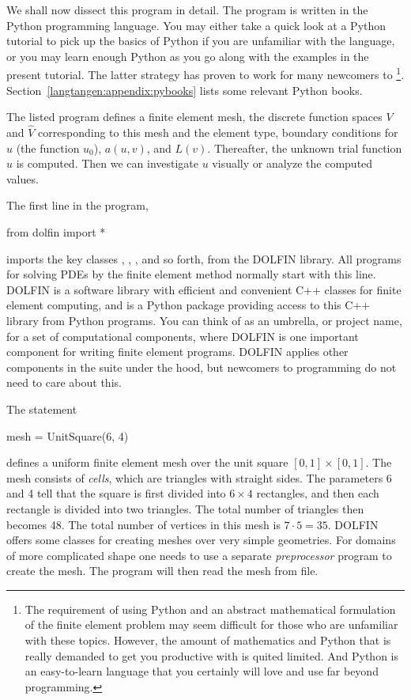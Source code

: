 We shall now dissect this \fenics{} program in detail. The program
is written in the Python programming language.
You may either take a quick look at a Python tutorial \citep{PythonTutorial}
to pick up the basics of Python if you are unfamiliar with the language,
or you may learn enough Python as you go along with the examples in the
present tutorial. The latter strategy has proven to work for many newcomers
to \fenics\footnote{The requirement of using Python and an abstract
mathematical formulation of the finite element problem may seem
difficult for those who are unfamiliar with these topics.
However, the amount of mathematics and Python that is really demanded
to get you productive with \fenics{} is quited limited.
And Python is an easy-to-learn language that you certainly will love
and use far beyond \fenics{} programming.}.
Section~\ref{langtangen:appendix:pybooks} lists some relevant Python books.

The listed \fenics{} program defines a finite element mesh, the discrete
function spaces $V$ and $\hat{V}$ corresponding to this mesh and
the element type, boundary conditions
for $u$ (the function $u_0$), $a(u,v)$, and $L(v)$.
Thereafter, the unknown
trial function $u$ is computed. Then we can investigate $u$ visually or
analyze the computed values.

The first line in the program,
\begin{python}
from dolfin import *
\end{python}
imports the key classes ,
, , and so forth, from the DOLFIN library.
All \fenics{} programs for solving PDEs by the finite element method
normally start with this line. DOLFIN is a software library with efficient
and convenient C++ classes for finite element computing, and
 is a Python package providing access to this
C++ library from Python programs.
You can think of \fenics{} as an umbrella, or project name, for a set of
computational components, where DOLFIN is one important component for
writing finite element programs. DOLFIN applies other components
in the \fenics{} suite under the hood, but newcomers to \fenics{}
programming do not need to care about this.

The statement
\begin{python}
mesh = UnitSquare(6, 4)
\end{python}
defines a uniform finite element mesh over the unit square
$[0,1]\times [0,1]$. The mesh consists of \emph{cells},
which are triangles with
straight sides. The parameters 6 and 4 tell that the square is
first divided into $6\times 4$ rectangles, and then each rectangle
is divided into two triangles. The total number of triangles
then becomes 48. The total number of vertices in this mesh is
$7\cdot 5=35$.
DOLFIN offers some classes for creating meshes over
very simple geometries. For domains of more complicated shape one needs
to use a separate \emph{preprocessor} program to create the mesh.
The \fenics{} program will then read the mesh from file.

